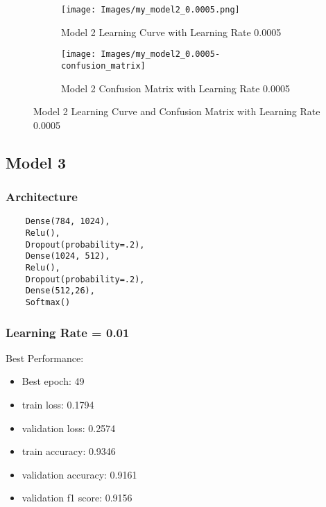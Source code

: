 \documentclass{article}
\begin{document}
\begin{figure}[h]
    \begin{subfigure}{0.5\textwidth}
        \texttt{[image: Images/my\_model2\_0.0005.png]} 
        \caption{Model 2 Learning Curve with Learning Rate 0.0005}
        \label{fig:model2_lr_0.0005}
    \end{subfigure}
    \begin{subfigure}{0.5\textwidth}
        \texttt{[image: Images/my\_model2\_0.0005-confusion\_matrix]} 
        \caption{Model 2 Confusion Matrix with Learning Rate 0.0005}
        \label{fig:model2_lr_0.0005_confusion_matrix}
    \end{subfigure}
    \caption{Model 2 Learning Curve and Confusion Matrix with Learning Rate 0.0005}
    \label{fig:model2_lr_0.0005_combined}
\end{figure}

\subsection{Model 3}
\subsubsection{Architecture}
\begin{verbatim}
    Dense(784, 1024),
    Relu(),
    Dropout(probability=.2),
    Dense(1024, 512),
    Relu(),
    Dropout(probability=.2),
    Dense(512,26),
    Softmax()
\end{verbatim}

\subsubsection{Learning Rate = 0.01}
Best Performance:
\begin{itemize}
    \item Best epoch: 49
    \item train loss: 0.1794
    \item validation loss: 0.2574
    \item train accuracy: 0.9346
    \item validation accuracy: 0.9161
    \item validation f1 score: 0.9156
\end{itemize}
\end{document}
